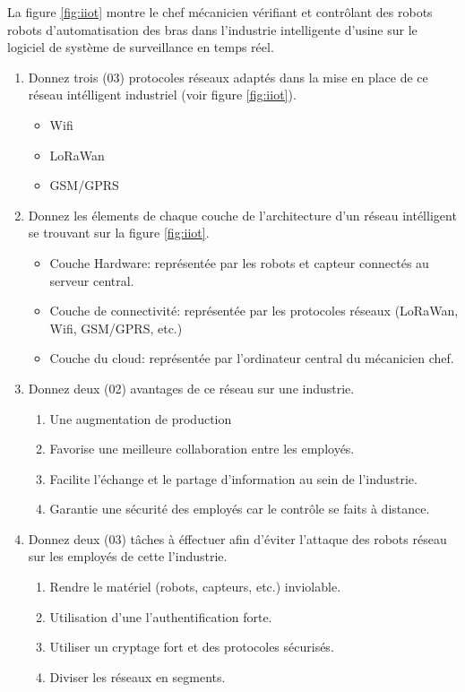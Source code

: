 

La figure \ref{fig:iiot} montre le chef mécanicien vérifiant et contrôlant des robots robots d'automatisation des bras dans l'industrie intelligente d'usine sur le logiciel de système de surveillance en temps réel.

\begin{enumerate}
    \item Donnez trois (03) protocoles réseaux adaptés dans la mise en place de ce réseau intélligent industriel (voir figure \ref{fig:iiot}).
          \begin{itemize}
              \item Wifi
              \item LoRaWan
              \item GSM/GPRS
          \end{itemize}
    \item Donnez les élements de chaque couche de l'architecture d'un réseau intélligent se trouvant sur la figure \ref{fig:iiot}.
          \begin{itemize}
              \item Couche Hardware: représentée par les robots et capteur connectés au serveur central.
              \item Couche de connectivité: représentée par les protocoles réseaux (LoRaWan, Wifi, GSM/GPRS, etc.)
              \item Couche du cloud: représentée par l'ordinateur central du mécanicien chef.
          \end{itemize}
    \item Donnez deux (02) avantages de ce réseau sur une industrie.
          \begin{enumerate}
              \item Une augmentation de production
              \item Favorise une meilleure collaboration entre les employés.
              \item Facilite l'échange et le partage d’information au sein de l'industrie.
              \item Garantie une sécurité des employés car le contrôle se faits à distance.
          \end{enumerate}
    \item Donnez deux (03) tâches à éffectuer afin d'éviter l'attaque des robots réseau sur les employés de cette l'industrie.
          \begin{enumerate}
              \item Rendre le matériel (robots, capteurs, etc.) inviolable.
              \item Utilisation d'une l’authentification forte.
              \item Utiliser un cryptage fort et des protocoles sécurisés.
              \item Diviser les réseaux en segments.
          \end{enumerate}
\end{enumerate}


